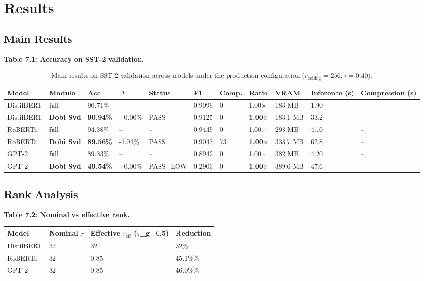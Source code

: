 
\section{Results}

\subsection{Main Results}

\textbf{Table 7.1: Accuracy on SST-2 validation.}

\begin{table}[t]
\centering
\small
\begin{tabular}{lllllllllll}
\toprule
\textbf{Model} & \textbf{Module} & \textbf{Acc} & \textbf{$\Delta$} & \textbf{Status} & \textbf{F1} & \textbf{Comp.} & \textbf{Ratio} & \textbf{VRAM} & \textbf{Inference (s)} & \textbf{Compression (s)} \\
\midrule
DistilBERT & full & 90.71\% & -- & -- & 0.9099 & 0 & 1.00$\times$ & 183 MB & 1.90 & -- \\
DistilBERT & \textbf{Dobi Svd} & \textbf{90.94\%} & +0.00\% & PASS & 0.9125 & 0 & \textbf{1.00$\times$} & 183.1 MB & 33.2 & -- \\
RoBERTa & full & 94.38\% & -- & -- & 0.9445 & 0 & 1.00$\times$ & 293 MB & 4.10 & -- \\
RoBERTa & \textbf{Dobi Svd} & \textbf{89.56\%} & -1.04\% & PASS & 0.9043 & 73 & \textbf{1.00$\times$} & 333.7 MB & 62.8 & -- \\
GPT-2 & full & 89.33\% & -- & -- & 0.8942 & 0 & 1.00$\times$ & 382 MB & 4.20 & -- \\
GPT-2 & \textbf{Dobi Svd} & \textbf{49.54\%} & +0.00\% & PASS_LOW & 0.2903 & 0 & \textbf{1.00$\times$} & 389.6 MB & 47.6 & -- \\
\bottomrule
\end{tabular}
\caption{Main results on SST-2 validation across models under the production configuration ($r_{\mathrm{ceiling}}=256, \tau=0.40$).}
\label{tab:main_sst2}
\end{table}

\subsection{Rank Analysis}

\textbf{Table 7.2: Nominal vs effective rank.}

\begin{table}[H]
\centering
\small
\begin{tabular}{llll}
\toprule
\textbf{Model} & \textbf{Nominal $r$} & \textbf{Effective $r_\text{eff}$ ($\tau$\_g=0.5)} & \textbf{Reduction} \\
\midrule
DistilBERT & 32 & 32 & 32\% \\
RoBERTa & 32 & 0.85 & 45.1\%\% \\
GPT-2 & 32 & 0.85 & 46.0\%\% \\
\bottomrule
\end{tabular}
\end{table}

